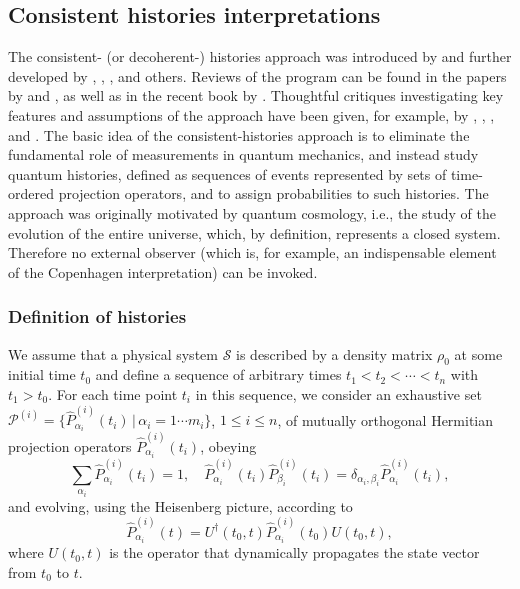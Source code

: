 \documentclass[twocolumn,rmp,aps,amsmath,amsfonts,noshowkeys,noshowpacs]{revtex4}
\begin{document}
\subsection{Consistent histories interpretations}

The consistent- (or decoherent-) histories approach was introduced by
\citet{Griffiths:1984:tr,Griffiths:1993:ll,Griffiths:1996:re} and
further developed by
\citet{Omnes:1988:lz,Omnes:1988:lq,Omnes:1988:zg,Omnes:1990:ww,%
  Omnes:1992:gy,Omnes:1994:pz,Omnes:2003:tt},
\citet{GellMann:1990:uz,GellMann:1991:wk,GellMann:1991:pp,GellMann:1993:oi},
\citet{Dowker:1992:vz}, and others.  Reviews of the program can be
found in the papers by \citet{Omnes:1992:gy} and
\citet{Halliwell:1993:ds,Halliwell:1995:gh}, as well as in the recent
book by \citet{Griffiths:2002:tr}. Thoughtful critiques investigating
key features and assumptions of the approach have been given, for
example, by \citet{Espagnat:1989:fl},
\citet{Dowker:1995:pa,Dowker:1996:ch}, \citet{Kent:1998:th}, and
\citet{Bassi:1999:zp}. The basic idea of the consistent-histories
approach is to eliminate the fundamental role of measurements in
quantum mechanics, and instead study quantum histories, defined as
sequences of events represented by sets of time-ordered projection
operators, and to assign probabilities to such histories. The approach
was originally motivated by quantum cosmology, i.e., the study of the
evolution of the entire universe, which, by definition, represents a
closed system. Therefore no external observer (which is, for example,
an indispensable element of the Copenhagen interpretation) can be
invoked.


\subsubsection{Definition of histories} 

We assume that a physical system $\mathcal{S}$ is described by a
density matrix $\rho_0$ at some initial time $t_0$ and define a sequence
of arbitrary times $t_1 < t_2 < \cdots < t_n$ with $t_1 > t_0$. For
each time point $t_i$ in this sequence, we consider an exhaustive set
$\mathcal{P}^{(i)} = \{ \widehat{P}^{(i)}_{\alpha_i}(t_i) \, | \,
\alpha_i = 1 \cdots m_i \}$, $1 \le i \le n$, of mutually orthogonal
Hermitian projection operators $\widehat{P}^{(i)}_{\alpha_i}(t_i)$,
obeying
%
\begin{equation} 
\sum_{\alpha_i} \widehat{P}^{(i)}_{\alpha_i}(t_i) = 1, \quad
\widehat{P}^{(i)}_{\alpha_i}(t_i) \widehat{P}^{(i)}_{\beta_i}(t_i) =
\delta_{\alpha_i,\beta_i} \widehat{P}^{(i)}_{\alpha_i}(t_i), 
\end{equation}
%
and evolving, using the Heisenberg picture, according to
%
\begin{equation}
\widehat{P}^{(i)}_{\alpha_i}(t) = U^\dagger(t_0,t)
\widehat{P}^{(i)}_{\alpha_i}(t_0) U(t_0,t),
\end{equation}
%
where $U(t_0,t)$ is the operator that dynamically propagates the state
vector from $t_0$ to $t$.
\end{document}
